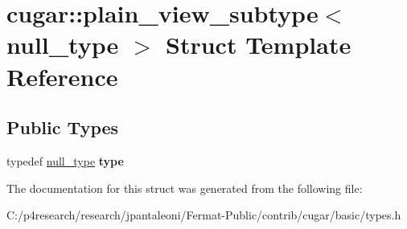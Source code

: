 \hypertarget{structcugar_1_1plain__view__subtype_3_01null__type_01_4}{}\section{cugar\+:\+:plain\+\_\+view\+\_\+subtype$<$ null\+\_\+type $>$ Struct Template Reference}
\label{structcugar_1_1plain__view__subtype_3_01null__type_01_4}
\subsection*{Public Types}
\begin{DoxyCompactItemize}
\item 
\mbox{\label{structcugar_1_1plain__view__subtype_3_01null__type_01_4_a53ff57078aa802aacba99bcd5e94a955}} 
typedef \hyperlink{structcugar_1_1null__type}{null\+\_\+type} {\bfseries type}
\end{DoxyCompactItemize}


The documentation for this struct was generated from the following file\+:\begin{DoxyCompactItemize}
\item 
C\+:/p4research/research/jpantaleoni/\+Fermat-\/\+Public/contrib/cugar/basic/types.\+h\end{DoxyCompactItemize}
